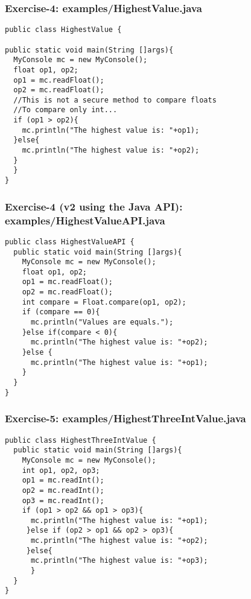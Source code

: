 \documentclass[xcolor=dvipsnames,dvip,notes=show,table]{beamer}
\begin{document}
\begin{frame}[fragile]
\frametitle{Exercise-4: examples/HighestValue.java}
\scriptsize
\begin{lstlisting}
public class HighestValue {

public static void main(String []args){
  MyConsole mc = new MyConsole();
  float op1, op2;
  op1 = mc.readFloat();
  op2 = mc.readFloat();
  //This is not a secure method to compare floats
  //To compare only int...
  if (op1 > op2){
    mc.println("The highest value is: "+op1);	
  }else{
    mc.println("The highest value is: "+op2);
  }
  }
}
\end{lstlisting}
\end{frame}

\begin{frame}[fragile]
\frametitle{Exercise-4 (v2 using the Java API): examples/HighestValueAPI.java}
\scriptsize
\begin{lstlisting}
public class HighestValueAPI {
  public static void main(String []args){
    MyConsole mc = new MyConsole();
    float op1, op2;
    op1 = mc.readFloat();
    op2 = mc.readFloat();
    int compare = Float.compare(op1, op2); 
    if (compare == 0){
      mc.println("Values are equals.");	
    }else if(compare < 0){
      mc.println("The highest value is: "+op2);
    }else {
      mc.println("The highest value is: "+op1);
    }
  }
}
\end{lstlisting}
\end{frame}




\begin{frame}[fragile]
\frametitle{Exercise-5: examples/HighestThreeIntValue.java}
\scriptsize
\begin{lstlisting}
public class HighestThreeIntValue {
  public static void main(String []args){
    MyConsole mc = new MyConsole();
    int op1, op2, op3;
    op1 = mc.readInt();
    op2 = mc.readInt();
    op3 = mc.readInt();
    if (op1 > op2 && op1 > op3){
      mc.println("The highest value is: "+op1);
     }else if (op2 > op1 && op2 > op3){
      mc.println("The highest value is: "+op2);
     }else{
      mc.println("The highest value is: "+op3);
      }
  }
}
\end{lstlisting}
\end{frame}
\end{document}
